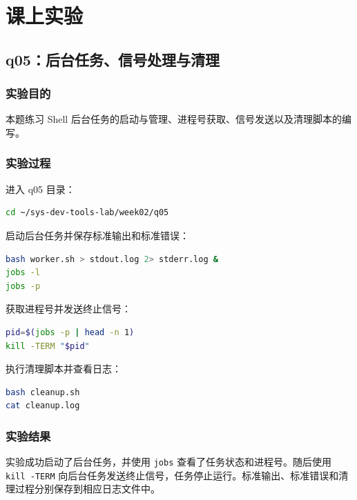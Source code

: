 \documentclass[UTF8,a4paper,12pt]{ctexart}
\begin{document}
\section{课上实验}

\subsection{q05：后台任务、信号处理与清理}

\subsubsection*{实验目的}

本题练习 Shell 后台任务的启动与管理、进程号获取、信号发送以及清理脚本的编写。

\subsubsection*{实验过程}

进入 q05 目录：

\begin{lstlisting}[language=bash]
cd ~/sys-dev-tools-lab/week02/q05
\end{lstlisting}

启动后台任务并保存标准输出和标准错误：

\begin{lstlisting}[language=bash]
bash worker.sh > stdout.log 2> stderr.log &
jobs -l
jobs -p
\end{lstlisting}

获取进程号并发送终止信号：

\begin{lstlisting}[language=bash]
pid=$(jobs -p | head -n 1)
kill -TERM "$pid"
\end{lstlisting}

执行清理脚本并查看日志：

\begin{lstlisting}[language=bash]
bash cleanup.sh
cat cleanup.log
\end{lstlisting}

\subsubsection*{实验结果}

实验成功启动了后台任务，并使用 \verb|jobs| 查看了任务状态和进程号。随后使用 \verb|kill -TERM| 向后台任务发送终止信号，任务停止运行。标准输出、标准错误和清理过程分别保存到相应日志文件中。
\end{document}

